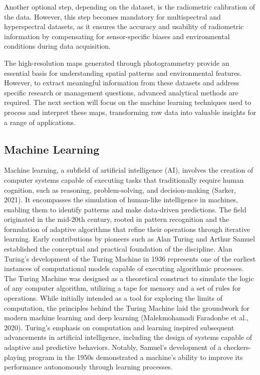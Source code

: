 \documentclass[
  letterpaper,
  11pt,
  english,
  singlespacing,
  headsepline]{MastersDoctoralThesis}
\begin{document}
\begin{spacing}{1.5}
Another optional step, depending on the dataset, is the radiometric
calibration of the data. However, this step becomes mandatory for
multispectral and hyperspectral datasets, as it ensures the accuracy and
usability of radiometric information by compensating for sensor-specific
biases and environmental conditions during data acquisition.

\begin{tcolorbox}
The high-resolution maps generated through photogrammetry provide an essential basis for understanding spatial patterns and environmental features. However, to extract meaningful information from these datasets and address specific research or management questions, advanced analytical methods are required. The next section will focus on the machine learning techniques used to process and interpret these maps, transforming raw data into valuable insights for a range of applications.
\end{tcolorbox}

\subsection{Machine Learning}\label{machine-learning}

Machine learning, a subfield of artificial intelligence (AI), involves
the creation of computer systems capable of executing tasks that
traditionally require human cognition, such as reasoning,
problem-solving, and decision-making (Sarker, 2021). It encompasses the
simulation of human-like intelligence in machines, enabling them to
identify patterns and make data-driven predictions. The field originated
in the mid-20th century, rooted in pattern recognition and the
formulation of adaptive algorithms that refine their operations through
iterative learning. Early contributions by pioneers such as Alan Turing
and Arthur Samuel established the conceptual and practical foundation of
the discipline. Alan Turing's development of the Turing Machine in 1936
represents one of the earliest instances of computational models capable
of executing algorithmic processes. The Turing Machine was designed as a
theoretical construct to simulate the logic of any computer algorithm,
utilizing a tape for memory and a set of rules for operations. While
initially intended as a tool for exploring the limits of computation,
the principles behind the Turing Machine laid the groundwork for modern
machine learning and deep learning (Malekmohamadi Faradonbe et al.,
2020). Turing's emphasis on computation and learning inspired subsequent
advancements in artificial intelligence, including the design of systems
capable of adaptive and predictive behaviors. Notably, Samuel's
development of a checkers-playing program in the 1950s demonstrated a
machine's ability to improve its performance autonomously through
learning processes.


\end{spacing}
\end{document}
